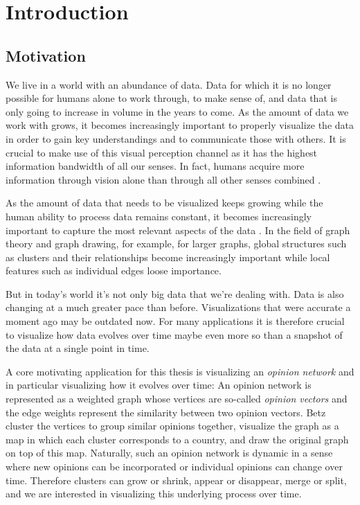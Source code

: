 \chapter{Introduction}
\label{chap:introduction}


\section{Motivation}
\label{sect:motivation}

We live in a world with an abundance of data. Data for which it is no longer possible for humans alone to work through, to make sense of, and data that is only going to increase in volume in the years to come. As the amount of data we work with grows, it becomes increasingly important to properly visualize the data in order to gain key understandings and to communicate those with others. It is crucial to make use of this visual perception channel as it has the highest information bandwidth of all our senses. In fact, humans acquire more information through vision alone than through all other senses combined \cite{ware}.

As the amount of data that needs to be visualized keeps growing while the human ability to process data remains constant, it becomes increasingly important to capture the most relevant aspects of the data \cite{dachsbacher}. In the field of graph theory and graph drawing, for example, for larger graphs, global structures such as clusters and their relationships become increasingly important while local features such as individual edges loose importance.

But in today's world it's not only big data that we're dealing with. Data is also changing at a much greater pace than before. Visualizations that were accurate a moment ago may be outdated now. For many applications it is therefore crucial to visualize how data evolves over time \emdash{} maybe even more so than a snapshot of the data at a single point in time.

A core motivating application for this thesis is visualizing an \emph{opinion network} \cite{betz} and in particular visualizing how it evolves over time: An opinion network is represented as a weighted graph whose vertices are so-called \emph{opinion vectors} and the edge weights represent the similarity between two opinion vectors. Betz \etal{} cluster the vertices to group similar opinions together, visualize the graph as a map in which each cluster corresponds to a country, and draw the original graph on top of this map. Naturally, such an opinion network is dynamic in a sense where new opinions can be incorporated or individual opinions can change over time. Therefore clusters can grow or shrink, appear or disappear, merge or split, and we are interested in visualizing this underlying process over time.



